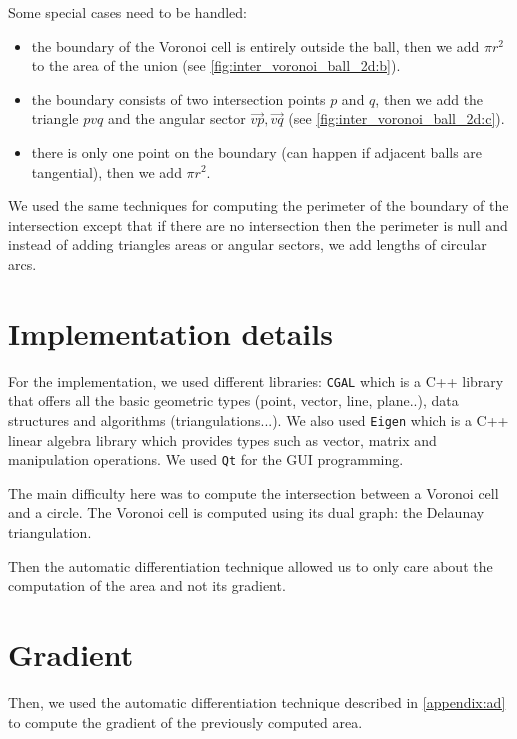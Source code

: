 Some special cases need to be handled:
\begin{itemize}
    \item the boundary of the Voronoi cell is entirely outside the ball, then we
        add $ \pi r^2 $ to the area of the union (see
        \ref{fig:inter_voronoi_ball_2d:b}).
    \item the boundary consists of two intersection points $ p $ and $ q $, then
        we add the triangle $ pvq $ and the angular sector $ \vec{vp}, \vec{vq}
        $ (see \ref{fig:inter_voronoi_ball_2d:c}).
    \item there is only one point on the boundary (can happen if adjacent balls
        are tangential), then we add $ \pi r^2 $.
\end{itemize}

We used the same techniques for computing the perimeter of the boundary of the
intersection except that if there are no intersection then the perimeter is null
and instead of adding triangles areas or angular sectors, we add lengths of
circular arcs.

\section{Implementation details}

For the implementation, we used different libraries: \texttt{CGAL} which is a
C++ library that offers all the basic geometric types (point, vector, line,
plane..), data structures and algorithms (triangulations...). We also used
\texttt{Eigen} which is a C++ linear algebra library which provides types such
as vector, matrix and manipulation operations. We used \texttt{Qt} for the GUI
programming.

The main difficulty here was to compute the intersection between a Voronoi cell
and a circle. The Voronoi cell is computed using its dual graph: the Delaunay
triangulation.

Then the automatic differentiation technique allowed us to only care about the
computation of the area and not its gradient.


\section{Gradient}

Then, we used the automatic differentiation technique described in
\ref{appendix:ad} to compute the gradient of the previously computed area.

